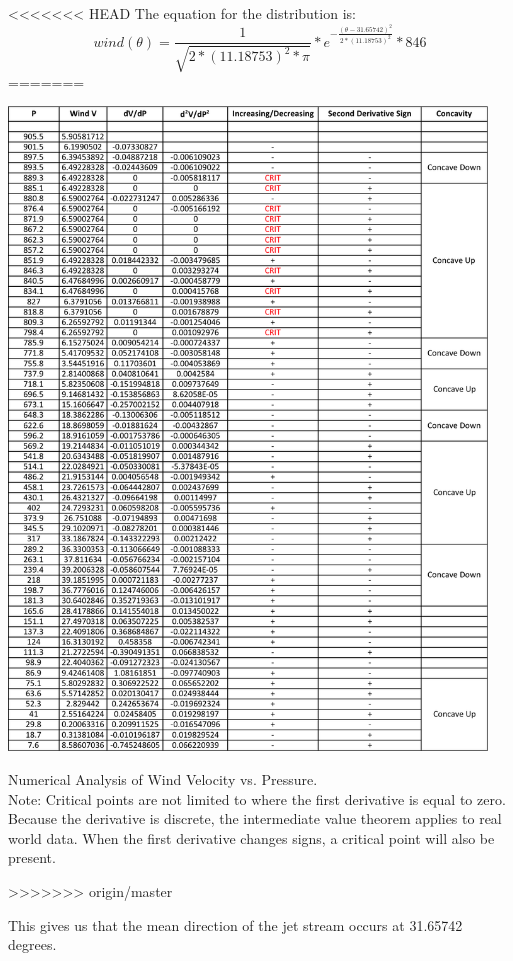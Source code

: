 \documentclass{journal}
\begin{document}
<<<<<<< HEAD
The equation for the distribution is:
\[
wind(\theta) = \frac{1}{\sqrt{2*(11.18753)^2*\pi}}*e^{-\frac{(\theta-31.65742)^2}{2*(11.18753)^2}}*846
\]
=======
\appendix
\begin{table}[H]
\centering
\includegraphics[width=5in]{PANDA.png}
\caption{Numerical Analysis of Wind Velocity vs. Pressure.  \\Note: Critical points are not limited to where the first derivative is equal to zero.  Because the derivative is discrete, the intermediate value theorem applies to real world data.  When the first derivative changes signs, a critical point will also be present. }
\end{table}
>>>>>>> origin/master

This gives us that the mean direction of the jet stream occurs at 31.65742 degrees.
\end{document}
